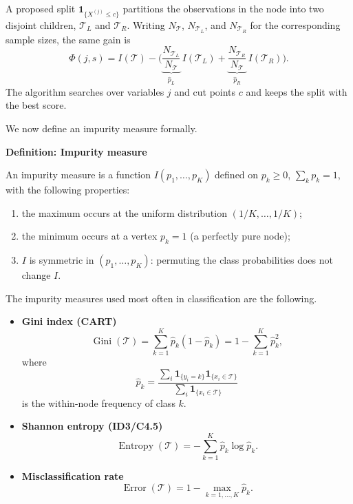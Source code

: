 \documentclass[
]{book}
\begin{document}
A proposed split \(\mathbf{1}_{\{X^{(j)}\leq c\}}\) partitions the observations in the node into two disjoint children, \(\mathcal{T}_{L}\) and \(\mathcal{T}_{R}\). Writing \(N_{\mathcal{T}}\), \(N_{\mathcal{T}_L}\), and \(N_{\mathcal{T}_R}\) for the corresponding sample sizes, the same gain is
\[
\Phi(j,s)
=
I(\mathcal{T})
-
\Biggl(
\underbrace{\frac{N_{\mathcal{T}_L}}{N_{\mathcal{T}}}}_{\hat{p}_L}\, I(\mathcal{T}_L)
+
\underbrace{\frac{N_{\mathcal{T}_R}}{N_{\mathcal{T}}}}_{\hat{p}_R}\, I(\mathcal{T}_R)
\Biggr).
\]
The algorithm searches over variables \(j\) and cut points \(c\) and keeps the split with the best score.

\vspace{0.6em}

We now define an impurity measure formally.

\textbf{Definition: Impurity measure}

An impurity measure is a function \(I(p_1, \ldots, p_K)\) defined on \(p_k \geq 0\), \(\sum_k p_k = 1\), with the following properties:

\begin{enumerate}
\def\labelenumi{(\alph{enumi})}
\item
  the maximum occurs at the uniform distribution \((1/K, \ldots, 1/K)\);
\item
  the minimum occurs at a vertex \(p_k = 1\) (a perfectly pure node);
\item
  \(I\) is symmetric in \((p_1, \ldots, p_K)\): permuting the class probabilities does not change \(I\).
\end{enumerate}

\vspace{0.6em}

The impurity measures used most often in classification are the following.

\begin{itemize}
\item
  \textbf{Gini index (CART)}
  \[
  \operatorname{Gini}(\mathcal{T})
  =
  \sum_{k=1}^{K} \hat{p}_k (1 - \hat{p}_k)
  =
  1 - \sum_{k=1}^{K} \hat{p}_k^2,
  \]
  where
  \[
  \hat{p}_k
  =
  \frac{\sum_i \mathbf{1}_{\{y_i=k\}} \mathbf{1}_{\{x_i \in \mathcal{T}\}}}{\sum_i \mathbf{1}_{\{x_i \in \mathcal{T}\}}}
  \]
  is the within-node frequency of class \(k\).
\item
  \textbf{Shannon entropy (ID3/C4.5)}
  \[
  \operatorname{Entropy}(\mathcal{T})
  = - \sum_{k=1}^{K} \hat{p}_k \log \hat{p}_k.
  \]
\item
  \textbf{Misclassification rate}
  \[
  \operatorname{Error}(\mathcal{T})
  =   1 - \max_{k=1,\ldots,K} \hat{p}_k.
  \]
\end{itemize}
\end{document}
